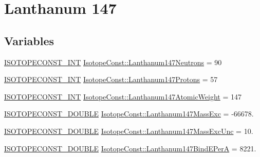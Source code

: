 \hypertarget{group___isotope_const-_lanthanum-_la147}{}\section{Lanthanum 147}
\label{group___isotope_const-_lanthanum-_la147}
\subsection*{Variables}
\begin{DoxyCompactItemize}
\item 
\mbox{\hyperlink{group___isotope_const-_macros_ga5f18360b3e99483a35c32d789e62621c}{I\+S\+O\+T\+O\+P\+E\+C\+O\+N\+S\+T\+\_\+\+I\+NT}} \mbox{\hyperlink{group___isotope_const-_lanthanum-_la147_ga3e08963755495490b76fe31dc42465f2}{Isotope\+Const\+::\+Lanthanum147\+Neutrons}} = 90
\item 
\mbox{\hyperlink{group___isotope_const-_macros_ga5f18360b3e99483a35c32d789e62621c}{I\+S\+O\+T\+O\+P\+E\+C\+O\+N\+S\+T\+\_\+\+I\+NT}} \mbox{\hyperlink{group___isotope_const-_lanthanum-_la147_gae536f3bd027684c0635ef78517cb3106}{Isotope\+Const\+::\+Lanthanum147\+Protons}} = 57
\item 
\mbox{\hyperlink{group___isotope_const-_macros_ga5f18360b3e99483a35c32d789e62621c}{I\+S\+O\+T\+O\+P\+E\+C\+O\+N\+S\+T\+\_\+\+I\+NT}} \mbox{\hyperlink{group___isotope_const-_lanthanum-_la147_gaaa3de4481a19a7ac8ebaf15b69c6e30b}{Isotope\+Const\+::\+Lanthanum147\+Atomic\+Weight}} = 147
\item 
\mbox{\hyperlink{group___isotope_const-_macros_ga8f45a7272ce02c0b4c65c44636ed719a}{I\+S\+O\+T\+O\+P\+E\+C\+O\+N\+S\+T\+\_\+\+D\+O\+U\+B\+LE}} \mbox{\hyperlink{group___isotope_const-_lanthanum-_la147_ga1eb93d77bbe220658d24499d8f97434f}{Isotope\+Const\+::\+Lanthanum147\+Mass\+Exc}} = -\/66678.
\item 
\mbox{\hyperlink{group___isotope_const-_macros_ga8f45a7272ce02c0b4c65c44636ed719a}{I\+S\+O\+T\+O\+P\+E\+C\+O\+N\+S\+T\+\_\+\+D\+O\+U\+B\+LE}} \mbox{\hyperlink{group___isotope_const-_lanthanum-_la147_ga43332dada9e2be0eb7565b16c06345bd}{Isotope\+Const\+::\+Lanthanum147\+Mass\+Exc\+Unc}} = 10.
\item 
\mbox{\hyperlink{group___isotope_const-_macros_ga8f45a7272ce02c0b4c65c44636ed719a}{I\+S\+O\+T\+O\+P\+E\+C\+O\+N\+S\+T\+\_\+\+D\+O\+U\+B\+LE}} \mbox{\hyperlink{group___isotope_const-_lanthanum-_la147_ga3b0dacbc79550d11a31ab22c8040d73a}{Isotope\+Const\+::\+Lanthanum147\+Bind\+E\+PerA}} = 8221.
\item 

\end{DoxyCompactItemize}

